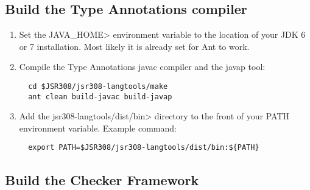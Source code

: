 \subsection{Build the Type Annotations compiler}

\begin{enumerate}
\item
Set the \<JAVA\_HOME> environment variable to the location of your JDK 6 or 7 installation. Most likely it is already set for Ant to work.
\item
Compile the Type Annotations javac compiler and the javap tool:

\begin{Verbatim}
  cd $JSR308/jsr308-langtools/make
  ant clean build-javac build-javap
\end{Verbatim}

\item
 Add the \<jsr308-langtools/dist/bin> directory to the front of your PATH environment variable.
  Example command:

\begin{Verbatim}
  export PATH=$JSR308/jsr308-langtools/dist/bin:${PATH}
\end{Verbatim}

\end{enumerate}



\subsection{Build the Checker Framework\label{building}}


